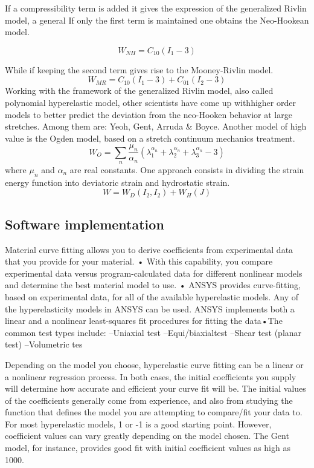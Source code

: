 If a compressibility term is added it gives the expression of the generalized Rivlin model, a general
If only the first term is maintained one obtains the Neo-Hookean model.

\begin{equation}
W_{NH}= C_{10}(I_1-3)
\end{equation}

While if keeping the second term gives rise to the Mooney-Rivlin model.
\begin{equation}
W_{MR}= C_{10}(I_1-3)+C_{01}(I_2-3)
\end{equation}
Working with the framework of the generalized Rivlin model, also called polynomial hyperelastic model, other scientists have come up withhigher order models  to better predict the deviation from the neo-Hooken behavior at large stretches. Among them are: Yeoh, Gent, Arruda \& Boyce.
Another model of high value is the Ogden model, based on a stretch continuum mechanics treatment.
\begin{equation}
W_{O}= \sum_n \frac{\mu_n}{\alpha_n}(\lambda_1^{\alpha_n}+\lambda_2^{\alpha_n}+\lambda_3^{\alpha_n}-3)
\end{equation}
where $\mu_n$ and $\alpha_n$ are real constants.
One approach consists in dividing the strain energy function into deviatoric strain and hydrostatic strain.
\begin{equation}
W=W_D(I_2,I_2)+W_H(J)
\end{equation}

\subsection{Software implementation}
Material curve fitting allows you to derive coefficients from experimental data that
you provide for your material.
• With this capability, you compare experimental data versus program-calculated data
for different nonlinear models and determine the best material model to use.
• ANSYS provides curve-fitting, based on experimental data, for all of the available
hyperelastic models. Any of the hyperelasticity models in ANSYS can be used.
ANSYS implements both a linear and a nonlinear least-squares fit procedures for fitting the data•The common test types include:
 –Uniaxial test –Equi/biaxialtest –Shear test (planar test) –Volumetric tes
 
 Depending on the model you choose, hyperelastic curve fitting can be a linear or a nonlinear regression process. In both cases, the initial coefficients you supply will determine how accurate and efficient your curve fit will be. The initial values of the coefficients generally come from experience, and also from studying the function that defines the model you are attempting to compare/fit your data to. For most hyperelastic models, 1 or -1 is a good starting point. However, coefficient values can vary greatly depending on the model chosen. The Gent model, for instance, provides good fit with initial coefficient values as high as 1000. 
 
